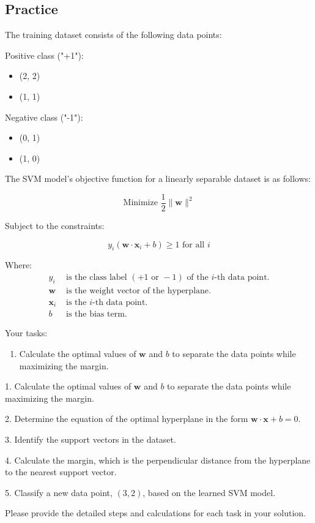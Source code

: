 \documentclass[]{article}
\begin{document}
	
	\subsection{Practice}
	The training dataset consists of the following data points:
	
	Positive class ("+1"):
	\begin{itemize}
		\item (2, 2)
		\item (1, 1)
	\end{itemize}
	
	Negative class ("-1"):
	\begin{itemize}
		\item (0, 1)
		\item (1, 0)
	\end{itemize}
	
	The SVM model's objective function for a linearly separable dataset is as follows:
	
	\[
	\text{Minimize } \frac{1}{2}\|\mathbf{w}\|^2
	\]
	
	Subject to the constraints:
	
	\[
	y_i(\mathbf{w}\cdot\mathbf{x}_i + b) \geq 1 \text{ for all } i
	\]
	
	Where:
	\begin{align*}
		y_i & \text{ is the class label } (+1 \text{ or } -1) \text{ of the } i\text{-th data point.} \\
		\mathbf{w} & \text{ is the weight vector of the hyperplane.} \\
		\mathbf{x}_i & \text{ is the } i\text{-th data point.} \\
		b & \text{ is the bias term.}
	\end{align*}
	
	Your tasks:
	\begin{enumerate}
		\item Calculate the optimal values of \(\mathbf{w}\) and \(b\) to separate the data points while maximizing the margin.
		
	\end{enumerate}
	
	1. Calculate the optimal values of \(\mathbf{w}\) and \(b\) to separate the data points while maximizing the margin.
	
	2. Determine the equation of the optimal hyperplane in the form \(\mathbf{w}\cdot\mathbf{x} + b = 0\).
	
	3. Identify the support vectors in the dataset.
	
	4. Calculate the margin, which is the perpendicular distance from the hyperplane to the nearest support vector.
	
	5. Classify a new data point, \((3, 2)\), based on the learned SVM model.
	
	Please provide the detailed steps and calculations for each task in your solution.
	
	
\end{document}
